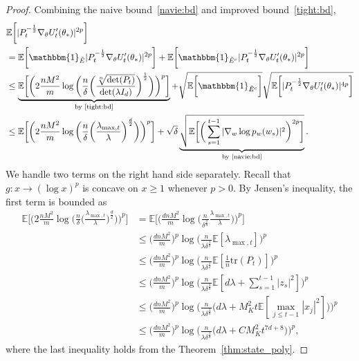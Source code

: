\documentclass[11pt]{article}
\theoremstyle{plain}
\theoremstyle{definition}
\theoremstyle{remark}
\begin{document}
\begin{proof}
Combining the naive bound~\eqref{navie:bd} and improved bound~\eqref{tight:bd}, 
\begin{align}\label{se}
      &\mathbb{E}\bigg[|P_{t}^{-\frac{1}{2}}\nabla_{\theta} U'_{t}(\theta_*)|^{2p}\bigg]\nonumber\\ &=\mathbb{E}\bigg[\mathbbm{1}_{\tilde E}|P_{t}^{-\frac{1}{2}}\nabla_{\theta} U'_{t}(\theta_*)|^{2p}\bigg] + \mathbb{E}\bigg[\mathbbm{1}_{\tilde E^c}|P_{t}^{-\frac{1}{2}}\nabla_{\theta} U'_{t}(\theta_*)|^{2p}\bigg]\nonumber\\
      &\leq \underbrace{\mathbb{E}\bigg[\bigg(2\frac{nM^2}{m}\log\bigg(\frac{n}{\delta}\bigg(\frac{\sqrt[n]{\det(P_{t})}}{\det(\lambda I_d)}\bigg)^{\frac{1}{2}}\bigg)\bigg)^p\bigg]}_\text{by \eqref{tight:bd}} + \sqrt{\mathbb{E}\bigg[\mathbbm{1}_{\tilde E^c}\bigg]}\sqrt{\mathbb{E}\bigg[|P_{t}^{-\frac{1}{2}}\nabla_{\theta} U'_{t}(\theta_*)|^{4p}\bigg]}\nonumber\\
      &\leq \mathbb{E}\bigg[\bigg(2\frac{nM^2}{m}\log\bigg(\frac{n}{\delta}\bigg(\frac{\lambda_{\max,t}}{\lambda}\bigg)^{\frac{d}{2}}\bigg)\bigg)^p\bigg]+\sqrt{\delta}\underbrace{\sqrt{\mathbb{E}\bigg[\bigg(\sum_{s=1}^{t-1}|\nabla_w \log p_w(w_s)|^2\bigg)^{2p}\bigg]}}_\text{by \eqref{navie:bd}}.
\end{align}
We handle two terms on the right hand side separately. Recall that $g:x\rightarrow (\log x)^p$ is concave on $x\geq 1$ whenever $p >0$. By Jensen's inequality, the first term is bounded as
\begin{equation*}
\begin{split}
    \mathbb{E}\bigg[\bigg(2\frac{nM^2}{m}\log\bigg(\frac{n}{\delta}\bigg(\frac{\lambda_{\max,t}}{\lambda}\bigg)^{\frac{d}{2}}\bigg)\bigg)^p\bigg]&=\mathbb{E}\bigg[\bigg(\frac{dnM^2}{m}\log\bigg(\frac{n}{\delta^{\frac{2}{d}}}\frac{\lambda_{\max,t}}{\lambda}\bigg)\bigg)^p\bigg]\\
    &\leq \bigg(\frac{dnM^2}{m}\bigg)^p\log\bigg(\frac{n}{\lambda\delta^{\frac{2}{d}}}\mathbb{E}[\lambda_{\max,t}]\bigg)^p\\
    &\leq \bigg(\frac{dnM^2}{m}\bigg)^p\log\bigg(\frac{n}{\lambda\delta^{\frac{2}{d}}}\mathbb{E}[\frac{1}{n}\mathrm{tr}(P_{t})]\bigg)^p\\
    &\leq \bigg(\frac{dnM^2}{m}\bigg)^p\log\bigg(\frac{n}{\lambda\delta^{\frac{2}{d}}}\mathbb{E}[d\lambda + \sum_{s=1}^{t-1}|z_s|^2]\bigg)^p\\
    &\leq \bigg(\frac{dnM^2}{m}\bigg)^p\log\bigg(\frac{n}{\lambda\delta^{\frac{2}{d}}}\bigg(d\lambda+M_K^2t\mathbb{E}[\max_{j\leq t-1}|x_j|^2]\bigg)\bigg)^p\\
    &\leq \bigg(\frac{dnM^2}{m}\bigg)^p\log\bigg(\frac{n}{\lambda\delta^{\frac{2}{d}}}\bigg(d\lambda+CM_K^2{t}^{7d+8}\bigg)\bigg)^p, 
\end{split}
\end{equation*}
where the last inequality holds from the Theorem~\ref{thm:state_poly}.


\end{proof}
\end{document}
